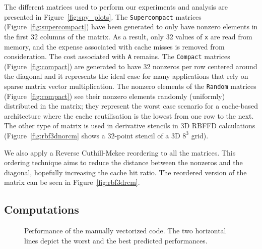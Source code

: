 \documentclass{sig-alternate}
\def\ttt#1{{\tt #1}}
\begin{document}
The different matrices used to perform our experiments and analysis
are presented in Figure~\ref{fig:spy_plots}. The
\ttt{Supercompact} matrices (Figure~\ref{fig:supercompact}) have been
generated to only have nonzero elements in the first 32 columns of
the matrix. As a result, only 32 values of {\tt x} are read
from memory, and the expense associated with cache misses is removed from consideration. The cost associated with 
{\tt A} remains. The \ttt{Compact} matrices
(Figure~\ref{fig:compact}) are generated to have 32 nonzeros per row
centered around the diagonal and it represents the ideal case for many
applications that rely on sparse matrix vector multiplication. The nonzero
elements of the \ttt{Random}
matrices (Figure~\ref{fig:compact}) see their nonzero elements
randomly (uniformly) distributed in the matrix; they represent the
worst case scenario for a cache-based architecture where the cache
reutilisation is the lowest from one row to the next.
The other type of matrix is used in derivative stencils in 3D
RBFFD calculations (Figure~\ref{fig:rbf3dnorcm} shows a $32$-point
stencil of a 3D $8^3$ grid).

We also apply a Reverse Cuthill-Mckee reordering to
all the matrices.  This ordering technique aims to reduce the
distance between the nonzeros and the diagonal, hopefully increasing 
the cache hit ratio.  The reordered version of the matrix can be
seen in Figure~\ref{fig:rbf3drcm}.

\vspace{-0.3em}
\subsection{Computations}

\begin{figure}[t]
  \centering
  
  \caption{Performance of the manually vectorized code. The two
    horizontal lines depict the worst and the best predicted performances.}
  \label{fig:expe_types}
\end{figure}
\end{document}

